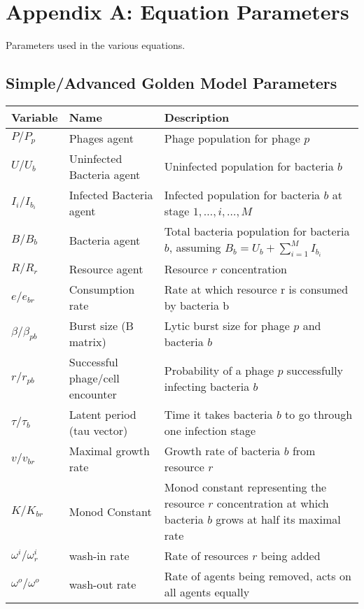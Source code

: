\chapter{Appendix A: Equation Parameters}
\label{AppendixA}
Parameters used in the various equations. 

\section{Simple/Advanced Golden Model Parameters}
\begin{table}[h!]
    \small %
    \centering
    \begin{tabularx}{\textwidth}{l l X}
        \toprule
        \textbf{Variable} & \textbf{Name} & \textbf{Description} \\
        \midrule
        $P / P_p$ & Phages agent & Phage population for phage $p$ \\
        $U / U_b$ & Uninfected Bacteria agent & Uninfected population for bacteria $b$ \\
        $I_i / I_{b_i}$ & Infected Bacteria agent & Infected population for bacteria $b$ at stage $1, \dots, i, \dots, M$ \\
        $B / B_b$ & Bacteria agent & Total bacteria population for bacteria $b$, assuming $B_b = U_b + \sum_{i=1}^M I_{b_i}$ \\
        $R / R_r$ & Resource agent & Resource $r$ concentration\\
        $e / e_{b r}$ & Consumption rate& Rate at which resource r is consumed by bacteria b\\
        $\beta / \beta_{p b}$ & Burst size (B matrix)& Lytic burst size for phage $p$ and bacteria $b$\\
        $r / r_{p b}$ & Successful phage/cell encounter & Probability of a phage $p$ successfully infecting bacteria $b$\\
        $\tau / \tau_{b}$ & Latent period (tau vector)& Time it takes bacteria $b$ to go through one infection stage\\
        $v / v_{b r}$ & Maximal growth rate & Growth rate of bacteria $b$ from resource $r$ \\
        $K / K_{b r}$ & Monod Constant & Monod constant representing the resource $r$ concentration at which bacteria $b$ grows at half its maximal rate\\
        $\omega^i / \omega^i_r$ & wash-in rate & Rate of resources $r$ being added\\
        $\omega^o / \omega^o$ & wash-out rate & Rate of agents being removed, acts on all agents equally\\

\end{tabularx}
\end{table}
